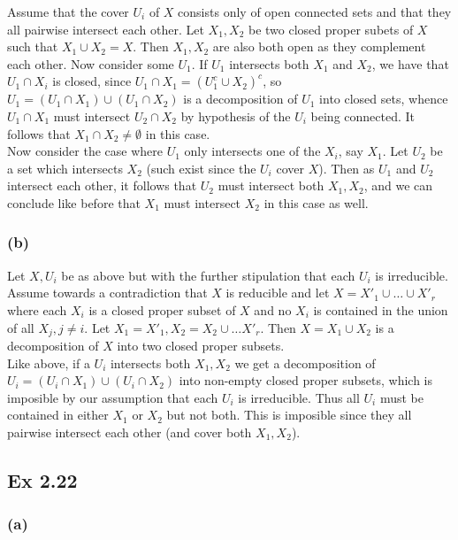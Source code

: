 \documentclass{article}
\theoremstyle{definition}
\begin{document}
Assume that the cover $U_i$ of $X$ consists only of open connected sets and
that they all pairwise intersect each other. Let $X_1, X_2$ be two closed
proper subets of $X$ such that $X_1 \cup X_2 = X$. Then $X_1, X_2$ are also
both open as they complement each other. Now consider some $U_1$. If $U_1$
intersects both $X_1$ and $X_2$, we have that $U_1 \cap X_i$ is closed, since
$U_1 \cap X_1 = (U_1^{c} \cup X_2)^{c}$, so $U_1 = (U_1 \cap X_1) \cup (U_1
\cap X_2)$ is a decomposition of $U_1$ into closed sets, whence $U_1 \cap
X_1$ must intersect $U_2 \cap X_2$ by hypothesis of the $U_i$ being connected.
It follows that $X_1 \cap X_2 \not = \emptyset$ in this case. \\

Now consider the case where $U_1$ only intersects one of the $X_i$, say $X_1$.
Let $U_2$ be a set which intersects $X_2$ (such exist since the $U_i$ cover
$X$). Then as $U_1$ and $U_2$ intersect each other, it follows that $U_2$ must
intersect both $X_1, X_2$, and we can conclude like before that $X_1$ must
intersect $X_2$ in this case as well. 

\subsubsection*{(b)}

Let $X, U_i$ be as above but with the further stipulation that each $U_i$ is
irreducible. Assume towards a contradiction that $X$ is reducible and let $X =
X'_1 \cup \ldots \cup X'_r$ where each $X_i$ is a closed proper subset of $X$
and no $X_i$ is contained in the union of all $X_j, j \not = i$. Let $X_1 =
X'_1, X_2 = X_2 \cup \ldots X'_r$. Then $X = X_1 \cup X_2$ is a decomposition
of $X$ into two closed proper subsets. \\

Like above, if a $U_i$ intersects both $X_1, X_2$ we get a decomposition of
$U_i = (U_i \cap X_1) \cup (U_i \cap X_2)$ into non-empty closed proper
subsets, which is imposible by our assumption that each $U_i$ is irreducible.
Thus all $U_i$ must be contained in either $X_1$ or $X_2$ but not both. This is
imposible since they all pairwise intersect each other (and cover both $X_1,
X_2$). 


\subsection*{Ex 2.22}

\subsubsection*{(a)}
\end{document}
